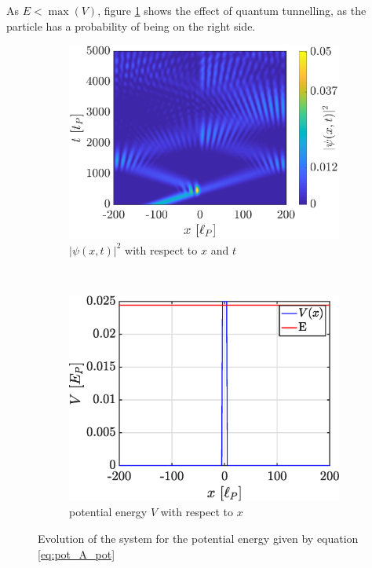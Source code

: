 \documentclass[a4paper,12pt,twoside]{article}
\newcommand{\bracket}[1]{\left(#1\right)}
\begin{document}
        As $E<\max\bracket{V}$, figure \ref{fig:v_pot_A_evo} shows the effect of quantum tunnelling, as the particle has a probability of being on the right side.

        \begin{figure}[h]
          \centering
          \begin{subfigure}[t]{0.45\textwidth}
            \includegraphics[width=\textwidth]{graphs/v_pot_A_evo.eps}
            \caption{$|\psi(x, t)|^2$ with respect to $x$ and $t$}
            \label{fig:v_pot_A_evo}
          \end{subfigure}
          ~
          \begin{subfigure}[t]{0.45\textwidth}
            \includegraphics[width=\textwidth]{graphs/v_pot_A_pot.eps}
            \caption{potential energy $V$ with respect to $x$}
            \label{fig:v_pot_A_pot}
          \end{subfigure}
          \caption{Evolution of the system for the potential energy given by equation \eqref{eq:pot_A_pot}}
          \label{fig:v_pot_A}
        \end{figure}
\end{document}
